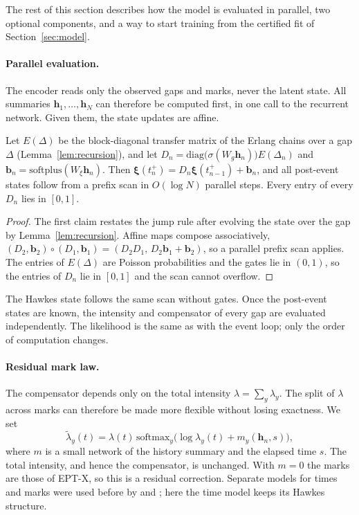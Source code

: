 The rest of this section describes how the model is evaluated in parallel, two optional
components, and a way to start training from the certified fit of Section~\ref{sec:model}.

\paragraph{Parallel evaluation.} The encoder reads only the observed gaps and marks, never the
latent state. All summaries $\bm h_1,\dots,\bm h_N$ can therefore be computed first, in one call to
the recurrent network. Given them, the state updates are affine.

\begin{lemma}\label{lem:scan}
Let $E(\Delta)$ be the block-diagonal transfer matrix of the Erlang chains over a gap $\Delta$
(Lemma~\ref{lem:recursion}), and let $D_n=\mathrm{diag}\bigl(\sigma(W_g\bm h_n)\bigr)E(\Delta_n)$ and
$\bm b_n=\mathrm{softplus}(W_\xi\bm h_n)$. Then $\bm\xi(t_n^+)=D_n\bm\xi(t_{n-1}^+)+\bm b_n$, and all
post-event states follow from a prefix scan in $O(\log N)$ parallel steps. Every entry of every
$D_n$ lies in $[0,1]$.
\end{lemma}

\begin{proof}
The first claim restates the jump rule after evolving the state over the gap by Lemma~\ref{lem:recursion}.
Affine maps compose associatively, $(D_2,\bm b_2)\circ(D_1,\bm b_1)=(D_2D_1,\,D_2\bm b_1+\bm b_2)$,
so a parallel prefix scan applies. The entries of $E(\Delta)$ are Poisson probabilities and the gates
lie in $(0,1)$, so the entries of $D_n$ lie in $[0,1]$ and the scan cannot overflow.
\end{proof}

The Hawkes state follows the same scan without gates. Once the post-event states are known, the
intensity and compensator of every gap are evaluated independently. The likelihood is the same as
with the event loop; only the order of computation changes.

\paragraph{Residual mark law.} The compensator depends only on the total intensity
$\lambda=\sum_y\lambda_y$. The split of $\lambda$ across marks can therefore be made more flexible
without losing exactness. We set
\[
\tilde\lambda_y(t)=\lambda(t)\,\mathrm{softmax}_y\bigl(\log\lambda_y(t)+m_y(\bm h_n,s)\bigr),
\]
where $m$ is a small network of the history summary and the elapsed time $s$. The total intensity,
and hence the compensator, is unchanged. With $m=0$ the marks are those of EPT-X, so this is a
residual correction. Separate models for times and marks were used before by
\citet{shchur2020intensity} and \citet{panos2024decomposable}; here the time model keeps its Hawkes
structure.

